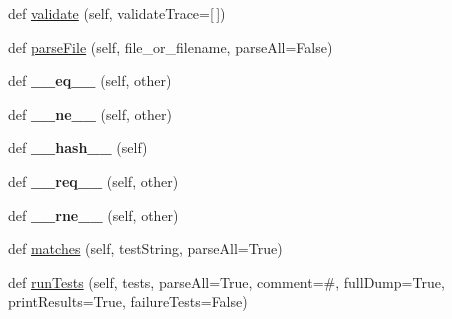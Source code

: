 \begin{DoxyCompactItemize}
\item 
def \hyperlink{classpkg__resources_1_1__vendor_1_1pyparsing_1_1_parser_element_acef95ab1d929446bddf8dc7c5e143c43}{validate} (self, validate\+Trace=\mbox{[}$\,$\mbox{]})
\item 
def \hyperlink{classpkg__resources_1_1__vendor_1_1pyparsing_1_1_parser_element_a58920492aecac3860b5013ea35bdca1d}{parse\+File} (self, file\+\_\+or\+\_\+filename, parse\+All=False)
\item 
\mbox{\label{classpkg__resources_1_1__vendor_1_1pyparsing_1_1_parser_element_a20b56b3e2a3a8da2918a9288e55c3370}} 
def {\bfseries \+\_\+\+\_\+eq\+\_\+\+\_\+} (self, other)
\item 
\mbox{\label{classpkg__resources_1_1__vendor_1_1pyparsing_1_1_parser_element_a4220b00deac3bef5d1766e2014b72881}} 
def {\bfseries \+\_\+\+\_\+ne\+\_\+\+\_\+} (self, other)
\item 
\mbox{\label{classpkg__resources_1_1__vendor_1_1pyparsing_1_1_parser_element_af223861097e3eb4e809bd350e5292f0c}} 
def {\bfseries \+\_\+\+\_\+hash\+\_\+\+\_\+} (self)
\item 
\mbox{\label{classpkg__resources_1_1__vendor_1_1pyparsing_1_1_parser_element_a6cd5feb55db6d0f92d81b3134ecef103}} 
def {\bfseries \+\_\+\+\_\+req\+\_\+\+\_\+} (self, other)
\item 
\mbox{\label{classpkg__resources_1_1__vendor_1_1pyparsing_1_1_parser_element_abdc153f5c1b26432e96c8c5b45e29a11}} 
def {\bfseries \+\_\+\+\_\+rne\+\_\+\+\_\+} (self, other)
\item 
def \hyperlink{classpkg__resources_1_1__vendor_1_1pyparsing_1_1_parser_element_ac13ecd02ff2ecec127dcc7e1cc94311c}{matches} (self, test\+String, parse\+All=True)
\item 
def \hyperlink{classpkg__resources_1_1__vendor_1_1pyparsing_1_1_parser_element_a9b310e792e7644f09f282e822487f333}{run\+Tests} (self, tests, parse\+All=True, comment=\textquotesingle{}\#\textquotesingle{}, full\+Dump=True, print\+Results=True, failure\+Tests=False)
\end{DoxyCompactItemize}
